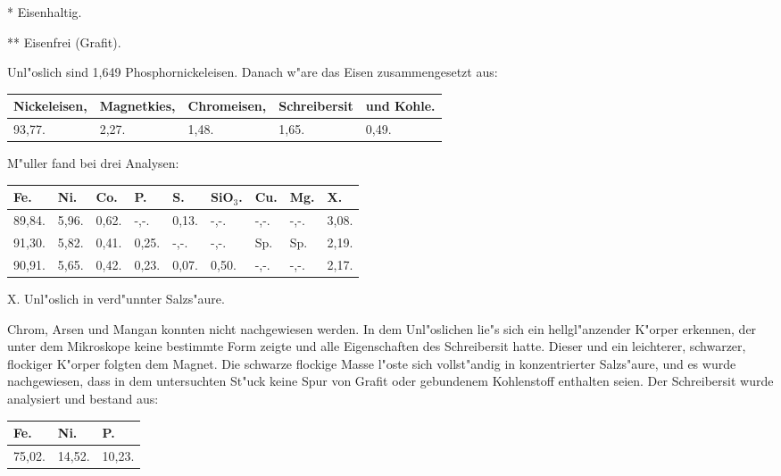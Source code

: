 \documentclass[a4paper, 11pt, oneside]{article}
\begin{document}
* Eisenhaltig.

** Eisenfrei (Grafit).

Unl"oslich sind 1,649 Phosphornickeleisen. Danach w"are das Eisen zusammengesetzt aus:
\begin{table}[H]
    \centering
    \begin{tabular}{l l l l l}
        Nickeleisen, & Magnetkies, & Chromeisen, & Schreibersit & und Kohle. \\ \hline
        93,77. & 2,27. & 1,48. & 1,65. & 0,49. \\
    \end{tabular}
\end{table}

M"uller fand bei drei Analysen:
\begin{table}[H]
    \centering
    \begin{tabular}{l l l l l l l l l}
        Fe. & Ni. & Co. & P. & S. & SiO$_{3}$. & Cu. & Mg. & X. \\ \hline
        89,84. & 5,96. & 0,62. & -,-. & 0,13. & -,-. & -,-. & -,-. & 3,08. \\
        91,30. & 5,82. & 0,41. & 0,25. & -,-. & -,-. & Sp. & Sp. & 2,19. \\
        90,91. & 5,65. & 0,42. & 0,23. & 0,07. & 0,50. & -,-. & -,-. & 2,17. \\
    \end{tabular}
\end{table}

X. Unl"oslich in verd"unnter Salzs"aure.

Chrom, Arsen und Mangan konnten nicht nachgewiesen werden. In dem Unl"oslichen lie"s sich ein hellgl"anzender K"orper erkennen, der unter dem Mikroskope keine bestimmte Form zeigte und alle Eigenschaften des Schreibersit hatte. Dieser und ein leichterer, schwarzer, flockiger K"orper folgten dem Magnet. Die schwarze flockige Masse l"oste sich vollst"andig in konzentrierter Salzs"aure, und es wurde nachgewiesen, dass in dem untersuchten St"uck keine Spur von Grafit oder gebundenem Kohlenstoff enthalten seien. Der Schreibersit wurde analysiert und bestand aus:
\begin{table}[H]
    \centering
    \begin{tabular}{l l l}
        Fe. & Ni. & P. \\ \hline
        75,02. & 14,52. & 10,23. \\
    \end{tabular}
\end{table}
\end{document}
